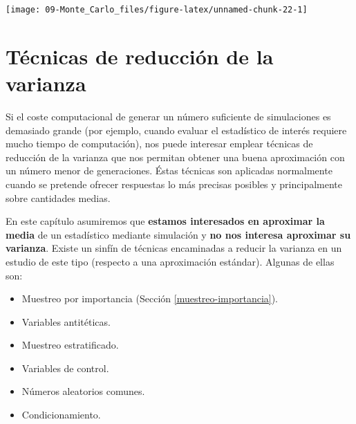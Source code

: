 \documentclass[
]{book}
\newenvironment{Shaded}{\begin{snugshade}}{\end{snugshade}}
\newcommand{\AttributeTok}[1]{\textcolor[rgb]{0.77,0.63,0.00}{#1}}
\newcommand{\CommentTok}[1]{\textcolor[rgb]{0.56,0.35,0.01}{\textit{#1}}}
\newcommand{\DecValTok}[1]{\textcolor[rgb]{0.00,0.00,0.81}{#1}}
\newcommand{\FunctionTok}[1]{\textcolor[rgb]{0.00,0.00,0.00}{#1}}
\newcommand{\NormalTok}[1]{#1}
\newcommand{\SpecialCharTok}[1]{\textcolor[rgb]{0.00,0.00,0.00}{#1}}
\theoremstyle{break}
\theoremstyle{definition}
\theoremstyle{definition}
\theoremstyle{definition}
\theoremstyle{definition}
\theoremstyle{remark}
\begin{document}
\begin{Shaded}
\end{Shaded}

\begin{center}\texttt{[image: 09-Monte\_Carlo\_files/figure-latex/unnamed-chunk-22-1]} \end{center}

\hypertarget{tuxe9cnicas-de-reducciuxf3n-de-la-varianza}{%
\chapter{Técnicas de reducción de la varianza}\label{tuxe9cnicas-de-reducciuxf3n-de-la-varianza}}

Si el coste computacional de generar un número suficiente de simulaciones es demasiado grande (por ejemplo, cuando evaluar el estadístico de interés requiere mucho tiempo de computación), nos puede interesar emplear técnicas de reducción de la varianza que nos permitan obtener una buena aproximación con un número menor de generaciones. Éstas técnicas son aplicadas normalmente cuando se pretende ofrecer respuestas lo más precisas posibles y principalmente sobre cantidades medias.

En este capítulo asumiremos que \textbf{estamos interesados en aproximar la media} de un estadístico mediante simulación y \textbf{no nos interesa aproximar su varianza}.
Existe un sinfín de técnicas encaminadas a reducir la varianza en un estudio de este tipo (respecto a una aproximación estándar).
Algunas de ellas son:

\begin{itemize}
\item
  Muestreo por importancia (Sección \ref{muestreo-importancia}).
\item
  Variables antitéticas.
\item
  Muestreo estratificado.
\item
  Variables de control.
\item
  Números aleatorios comunes.
\item
  Condicionamiento.
\end{itemize}
\end{document}
